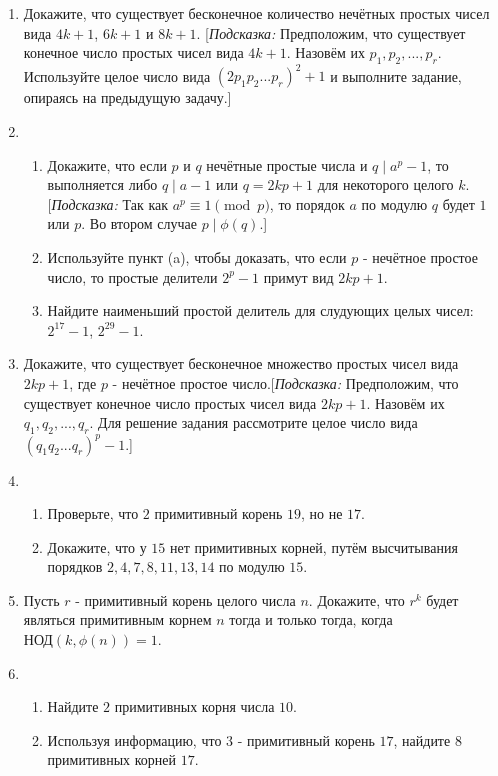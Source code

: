 \documentclass[twoside,12pt]{article}
\begin{document}
{\begin{enumerate}[label=\textbf{\arabic*.}]
\begin{enumerate}
         \item Нечётные простые делители целого числа $n^{4}+1$ имеют вид $8k+1$.
         \item Нечётные простые делители целого числа $n^{2}+n+1$, отличные от $3$ имеют вид $6k+1$.	\end{enumerate}
     \item Докажите, что существует бесконечное количество нечётных простых чисел вида $4k+1$, $6k+1$ и $8k+1$. [\textit{Подсказка:} Предположим, что существует конечное число простых чисел вида $4k+1$. Назовём их $p_{1},p_{2},...,p_{r}$. Используйте целое число вида $(2p_{1}p_{2}...p_{r})^{2}+1$ и выполните задание, опираясь на предыдущую задачу.]
     \item \begin{enumerate} \item Докажите, что если $p$ и $q$ нечётные простые числа и $q\mid a^{p}-1$, то выполняется либо $q\mid a-1$ или $q=2kp+1$ для некоторого целого $k$. [\textit{Подсказка:} Так как $a^{p}\equiv1 \pmod{p}$, то порядок $a$ по модулю $q$ будет $1$ или $p$. Во втором случае $p\mid\phi(q)$.]
                              \item Используйте пункт (a), чтобы доказать, что если $p$ - нечётное простое число, то простые делители $2^{p}-1$ примут вид $2kp+1$.
                              \item Найдите наименьший простой делитель для слудующих целых чисел: $2^{17}-1$, $2^{29}-1$.
                              \end{enumerate}
      \item Докажите, что существует бесконечное множество простых чисел вида $2kp+1$, где $p$ - нечётное простое число.[\textit{Подсказка:} Предположим, что существует конечное число простых чисел вида $2kp+1$. Назовём их $q_{1},q_{2},...,q_{r}$. Для решение задания рассмотрите целое число вида $(q_{1}q_{2}...q_{r})^{p}-1$.]     
      \item  \begin{enumerate} \item Проверьте, что $2$ примитивный корень $19$, но не $17$.
      	                       \item Докажите, что у $15$ нет примитивных корней, путём высчитывания порядков $2,4,7,8,11,13,14$ по модулю $15$. \end{enumerate}    
      \item Пусть $r$ - примитивный корень целого числа $n$. Докажите, что $r^{k}$ будет являться примитивным корнем $n$ тогда и только тогда, когда $\text{НОД}(k,\phi(n))=1$.
      \item  \begin{enumerate} \item Найдите $2$ примитивных корня числа $10$.
                               \item Используя информацию, что $3$ - примитивный корень $17$, найдите $8$ примитивных корней $17$.\end{enumerate}
      
	

\end{enumerate}
}\newpage
\end{document}
